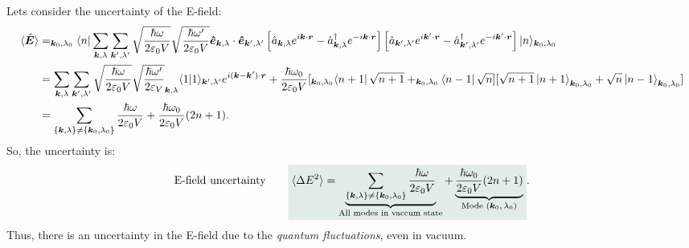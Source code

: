 Lets consider the uncertainty of the E-field:
\begin{align*}
    \langle\hat{\bm{E}}\rangle&=_{\bm{k}_0,\lambda_0}\langle n|\sum_{\bm{k},\lambda}\sum_{\bm{k}',\lambda'}\sqrt{\frac{\hbar\omega}{2\varepsilon_0V}}\sqrt{\frac{\hbar\omega'}{2\varepsilon_0V}}\bm{\hat{e}}_{\bm{k},\lambda}\cdot\bm{\hat{e}}_{\bm{k}',\lambda'}
    \left[\hat{a}_{\bm{k},\lambda}e^{i\bm{k}\cdot\bm{r}}-\hat{a}^\dagger_{\bm{k},\lambda}e^{-i\bm{k}\cdot\bm{r}}\right]\left[\hat{a}_{\bm{k}',\lambda'}e^{i\bm{k}'\cdot\bm{r}}-\hat{a}^\dagger_{\bm{k}',\lambda'}e^{-i\bm{k}'\cdot\bm{r}}\right]|n\rangle_{\bm{k}_0,\lambda_0}\\
    &=\sum_{\bm{k},\lambda}\sum_{\bm{k}',\lambda'}\sqrt{\frac{\hbar\omega}{2\varepsilon_0V}}\sqrt{\frac{\hbar\omega'}{2\varepsilon_V}}_{\bm{k},\lambda}\langle1|1\rangle_{\bm{k}',\lambda'}e^{i(\bm{k}-\bm{k}')\cdot\bm{r}}+
    \frac{\hbar\omega_0}{2\varepsilon_0V}[_{\bm{k}_0,\lambda_0}\left\langle n+1\right|\sqrt{n+1}+_{\bm{k}_0,\lambda_0}\left\langle n-1\right|\sqrt{n}][\sqrt{n+1}\left|n+1\right\rangle_{\bm{k}_0,\lambda_0}+\sqrt{n}\left|n-1\right\rangle_{\bm{k}_0,\lambda_0}]\\
    &=\sum_{\{\bm{k},\lambda\}\neq\{\bm{k}_0,\lambda_0\}}\frac{\hbar\omega}{2\varepsilon_0V}+\frac{\hbar\omega_0}{2\varepsilon_0V}(2n+1).
\end{align*}
So, the uncertainty is:
\begin{align*}
    \text{E-field uncertainty}\qquad\highlight{\braket{\Delta E^2}=\underbrace{\sum_{\{\bk,\lambda\}\neq\{\bk_0,\lambda_0\}}\frac{\hbar\omega}{2\varepsilon_0V}}_{\text{All modes in vaccum state}}+\underbrace{\frac{\hbar\omega_0}{2\varepsilon_0V}(2n+1)}_{\text{Mode ($\bk_0,\lambda_0$)}}}.
\end{align*}
Thus, there is an uncertainty in the E-field due to the \emph{quantum fluctuations}, even in vacuum.
